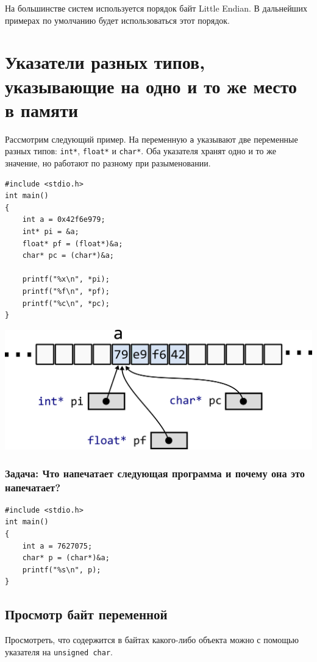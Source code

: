 \documentclass{article}
\begin{document}
На большинстве систем используется порядок байт Little Endian. В дальнейших примерах по умолчанию будет использоваться этот порядок.

\newpage
\section*{Указатели разных типов, указывающие на одно и то же место в памяти}
Рассмотрим следующий пример. На переменную \texttt{a} указывают две переменные разных типов: \texttt{int*}, \texttt{float*} и \texttt{char*}. Оба указателя хранят одно и то же значение, но работают по разному при разыменовании.

\begin{multicols}{2}
\begin{lstlisting}
#include <stdio.h>
int main() 
{
    int a = 0x42f6e979;
    int* pi = &a;
    float* pf = (float*)&a;
    char* pc = (char*)&a;
    
    printf("%x\n", *pi);
    printf("%f\n", *pf);
    printf("%c\n", *pc);
}
\end{lstlisting}
\vfill
\columnbreak
\hfill \break
\begin{center}
\includegraphics[scale=0.65]{../images/memory_int_char_pointer.png}
\end{center}
\hfill \break
\end{multicols}

\subsubsection*{Задача: Что напечатает следующая программа и почему она это напечатает?}
\begin{lstlisting} 
#include <stdio.h>
int main() 
{
    int a = 7627075;
    char* p = (char*)&a;
    printf("%s\n", p);
}
\end{lstlisting}



\subsection*{Просмотр байт переменной}
Просмотреть, что содержится в байтах какого-либо объекта можно с помощью указателя на \texttt{unsigned char}.
\end{document}

